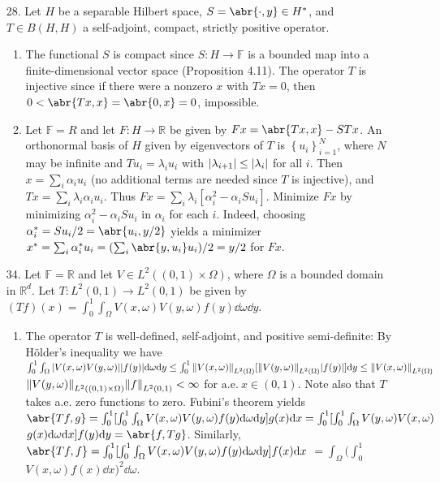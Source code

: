 \documentclass[11pt,leqno]{article}
\theoremstyle{plain}
\theoremstyle{definition}
\numberwithin{equation}{section}
\numberwithin{lem}{section}
\newcommand{\cbr}[1]{\left\{#1\right\}}
\begin{document}
\begin{enumerate}
    \item[28.] Let $H$ be a separable Hilbert space, $S = \abr{\cdot,y}\in H^\ast$, and $T\in B(H,H)$ a self-adjoint, compact, strictly positive operator.
    \begin{enumerate}
      \item The functional $S$ is compact since $S\colon H\to \mathbb F$ is a bounded map into a finite-dimensional vector space (Proposition 4.11). The operator $T$ is injective since if there were a nonzero $x$ with $Tx = 0$, then $0<\abr{Tx,x}= \abr{0,x} = 0$, impossible.
      \item Let $\mathbb F = R$ and let $F\colon H\to \mathbb R$ be given by $Fx = \abr{Tx,x} - STx$. An orthonormal basis of $H$ given by eigenvectors of $T$ is $\cbr{u_i}_{i=1}^N$, where $N$ may be infinite and $Tu_i = \lambda_iu_i$ with $\abs{\lambda_{i+1}}\leq \abs{\lambda_i}$ for all $i$. Then $x = \sum_i\alpha_iu_i$ (no additional terms are needed since $T$ is injective), and $Tx = \sum_i\lambda_i\alpha_iu_i$. Thus $Fx = \sum_i\lambda_i[\alpha_i^2-\alpha_iSu_i]$. Minimize $Fx$ by minimizing $\alpha_i^2-\alpha_iSu_i$ in $\alpha_i$ for each $i$. Indeed, choosing $\alpha_i^\ast = Su_i/2 = \abr{u_i,y/2}$ yields a minimizer $x^\ast = \sum_i\alpha_i^\ast u_i = (\sum_i\abr{y,u_i}u_i)/2 = y/2$ for $Fx$.
    \end{enumerate}
    \item[34.] Let $\mathbb F = \mathbb R$ and let $V\in L^2((0,1)\times \Omega)$, where $\Omega$ is a bounded domain in $\mathbb R^d$. Let $T\colon L^2(0,1)\to L^2(0,1)$ be given by $(Tf)(x) = \int_0^1\int_\Omega V(x,\omega)V(y,\omega)f(y)\dd \omega\dd y$.
    \begin{enumerate}
      \item The operator $T$ is well-defined, self-adjoint, and positive semi-definite: By H\"older's inequality we have $\int_0^1\int_\Omega\abs{V(x,\omega)V(y,\omega)}\abs{f(y)}\dd\omega\dd y\leq \int_0^1 \norm{V(x,\omega)}_{L^2(\Omega)}[\norm{V(y,\omega)}_{L^2(\Omega)}\abs{f(y)}]\dd y\leq \norm{V(x,\omega)}_{L^2(\Omega)}$
      $\norm{V(y,\omega)}_{L^2((0,1)\times\Omega)}\norm{f}_{L^2(0,1)}<\infty$ for $\mathrm{a.e.}~ x\in(0,1)$. Note also that $T$ takes a.e. zero functions to zero.
      Fubini's theorem yields $\abr{Tf,g} = \int_0^1[\int_0^1\int_\Omega V(x,\omega)V(y,\omega)f(y)\dd\omega\dd y]g(x)\dd x = \int_0^1[\int_0^1\int_\Omega V(y,\omega)V(x,\omega)$
      $g(x)\dd\omega\dd x]f(y)\dd y = \abr{f,Tg}$.
      Similarly, $\abr{Tf,f} = \int_0^1[\int_0^1\int_\Omega V(x,\omega)V(y,\omega)f(y)\dd\omega\dd y]f(x)\dd x$
      $= \int_\Omega (\int_0^1$
      $ V(x,\omega)f(x)\dd x)^2\dd\omega$.


\end{enumerate}
\end{enumerate}
\end{document}
